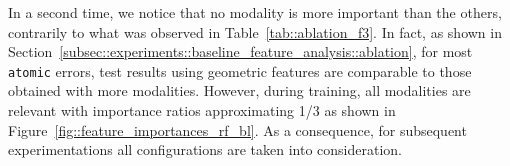         In a second time, we notice that no modality is more important than the others, contrarily to what was observed in Table~\ref{tab::ablation_f3}.
        In fact, as shown in Section~\ref{subsec::experiments::baseline_feature_analysis::ablation}, for most \texttt{atomic} errors, test results using geometric features are comparable to those obtained with more modalities.
        However, during training, all modalities are relevant with importance ratios approximating 1/3 as shown in Figure~\ref{fig::feature_importances_rf_bl}.
        As a consequence, for subsequent experimentations all configurations are taken into consideration.
